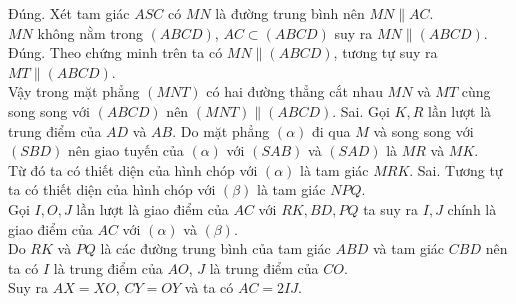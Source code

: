 \begin{ex}
{\begin{itemchoice}
   \itemch Đúng. Xét tam giác $ASC$ có $MN$ là đường trung bình nên $MN\parallel AC$.\\ $MN$ không nằm  trong $(ABCD)$, $AC\subset (ABCD)$ suy ra $MN\parallel (ABCD)$.
   \itemch Đúng. Theo chứng minh trên ta có $MN\parallel  (ABCD)$, tương tự suy ra $MT \parallel (ABCD)$.\\
   Vậy trong mặt phẳng $(MNT)$ có hai đường thẳng cắt nhau $MN$ và $MT$ cùng song song với $(ABCD)$  nên $(MNT)\parallel (ABCD)$.
   \itemch Sai. Gọi $K, R$ lần lượt là trung điểm của $AD$ và $AB$. Do mặt phẳng $(\alpha)$ đi qua $M$  và song song với $(SBD)$ nên giao tuyến của $(\alpha)$ với $(SAB)$ và $(SAD)$ là $MR$ và $MK$.\\
   Từ đó ta có thiết diện của hình chóp với $(\alpha)$ là tam  giác $MRK$.
   \itemch Sai. Tương tự ta có thiết diện của hình chóp với $(\beta)$ là tam  giác $NPQ$.\\
   Gọi $I, O, J$  lần lượt là giao điểm của $AC$ với $RK, BD, PQ$ ta suy ra $I, J$ chính là giao điểm của $AC$ với $(\alpha)$ và $(\beta)$.\\
   Do $RK$ và $PQ$ là các đường trung bình của tam giác $ABD$ và  tam giác $CBD$ nên ta có $I$ là trung điểm của $AO$, $J$ là trung điểm của $CO$.\\
    Suy ra $AX=XO$, $CY=OY$ và ta có $AC=2IJ$.
  \end{itemchoice}
 } 
\end{ex}

